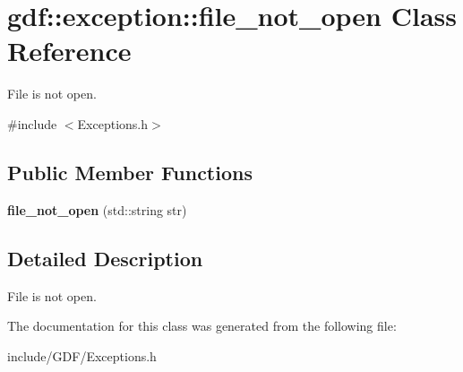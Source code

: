 \hypertarget{classgdf_1_1exception_1_1file__not__open}{
\section{gdf::exception::file\_\-not\_\-open Class Reference}
\label{classgdf_1_1exception_1_1file__not__open}
}


File is not open.  




{\ttfamily \#include $<$Exceptions.h$>$}

\subsection*{Public Member Functions}
\begin{DoxyCompactItemize}
\item 
\hypertarget{classgdf_1_1exception_1_1file__not__open_adc1b7f7e6b85dacda900d7144bac65a4}{
{\bfseries file\_\-not\_\-open} (std::string str)}
\label{classgdf_1_1exception_1_1file__not__open_adc1b7f7e6b85dacda900d7144bac65a4}

\end{DoxyCompactItemize}


\subsection{Detailed Description}
File is not open. 

The documentation for this class was generated from the following file:\begin{DoxyCompactItemize}
\item 
include/GDF/Exceptions.h\end{DoxyCompactItemize}

